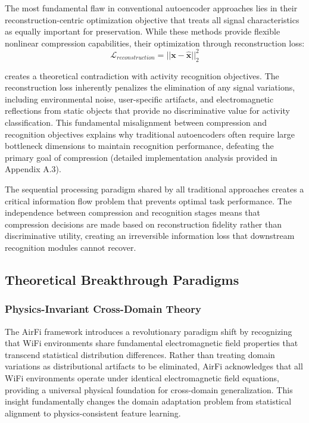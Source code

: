 \documentclass[journal]{IEEEtran}
\begin{document}
The most fundamental flaw in conventional autoencoder approaches lies in their reconstruction-centric optimization objective that treats all signal characteristics as equally important for preservation. While these methods provide flexible nonlinear compression capabilities, their optimization through reconstruction loss:
$$\mathcal{L}_{reconstruction} = ||\mathbf{x} - \hat{\mathbf{x}}||_2^2$$

creates a theoretical contradiction with activity recognition objectives. The reconstruction loss inherently penalizes the elimination of any signal variations, including environmental noise, user-specific artifacts, and electromagnetic reflections from static objects that provide no discriminative value for activity classification. This fundamental misalignment between compression and recognition objectives explains why traditional autoencoders often require large bottleneck dimensions to maintain recognition performance, defeating the primary goal of compression (detailed implementation analysis provided in Appendix A.3).

The sequential processing paradigm shared by all traditional approaches creates a critical information flow problem that prevents optimal task performance. The independence between compression and recognition stages means that compression decisions are made based on reconstruction fidelity rather than discriminative utility, creating an irreversible information loss that downstream recognition modules cannot recover.

\subsection{Theoretical Breakthrough Paradigms}

\subsubsection{Physics-Invariant Cross-Domain Theory}

The AirFi framework \cite{wang2022airfi} introduces a revolutionary paradigm shift by recognizing that WiFi environments share fundamental electromagnetic field properties that transcend statistical distribution differences. Rather than treating domain variations as distributional artifacts to be eliminated, AirFi acknowledges that all WiFi environments operate under identical electromagnetic field equations, providing a universal physical foundation for cross-domain generalization. This insight fundamentally changes the domain adaptation problem from statistical alignment to physics-consistent feature learning.
\end{document}
